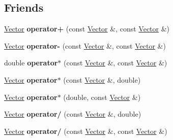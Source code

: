 \subsection*{\-Friends}
\begin{DoxyCompactItemize}
\item 
\hypertarget{class_vector_af3fdd2b7487c71d4b20a74e30a95891d}{
\hyperlink{class_vector}{\-Vector} {\bfseries operator+} (const \hyperlink{class_vector}{\-Vector} \&, const \hyperlink{class_vector}{\-Vector} \&)}
\label{class_vector_af3fdd2b7487c71d4b20a74e30a95891d}

\item 
\hypertarget{class_vector_ac4505f13a01e5d3312660626ae4ddebb}{
\hyperlink{class_vector}{\-Vector} {\bfseries operator-\/} (const \hyperlink{class_vector}{\-Vector} \&, const \hyperlink{class_vector}{\-Vector} \&)}
\label{class_vector_ac4505f13a01e5d3312660626ae4ddebb}

\item 
\hypertarget{class_vector_af1d37366ff3e48ec9bb37885cdf89f71}{
double {\bfseries operator$\ast$} (const \hyperlink{class_vector}{\-Vector} \&, const \hyperlink{class_vector}{\-Vector} \&)}
\label{class_vector_af1d37366ff3e48ec9bb37885cdf89f71}

\item 
\hypertarget{class_vector_ad5b5658ce9cdb77c1e02c0716b4446c6}{
\hyperlink{class_vector}{\-Vector} {\bfseries operator$\ast$} (const \hyperlink{class_vector}{\-Vector} \&, double)}
\label{class_vector_ad5b5658ce9cdb77c1e02c0716b4446c6}

\item 
\hypertarget{class_vector_af5e2acc16843ab7b90d3c5755125fef4}{
\hyperlink{class_vector}{\-Vector} {\bfseries operator$\ast$} (double, const \hyperlink{class_vector}{\-Vector} \&)}
\label{class_vector_af5e2acc16843ab7b90d3c5755125fef4}

\item 
\hypertarget{class_vector_adc4d2909e834dd600fae663f2c98a432}{
\hyperlink{class_vector}{\-Vector} {\bfseries operator/} (const \hyperlink{class_vector}{\-Vector} \&, double)}
\label{class_vector_adc4d2909e834dd600fae663f2c98a432}

\item 
\hypertarget{class_vector_a7ac2d5db6d0258692a3278bf90069c6a}{
\hyperlink{class_vector}{\-Vector} {\bfseries operator/} (const \hyperlink{class_vector}{\-Vector} \&, const \hyperlink{class_vector}{\-Vector} \&)}
\label{class_vector_a7ac2d5db6d0258692a3278bf90069c6a}


\end{DoxyCompactItemize}
